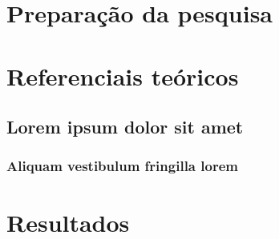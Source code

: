 \documentclass[
	12pt,                     %
	openright,                %
	oneside,                  %
	a4paper,                  %
	english,                  %
	brazil                    %
]{abntex2}
\begin{document}
\frenchspacing  %

\pretextual
\imprimircapa
\imprimirfolhaderosto*


\tableofcontents*
\cleardoublepage

\textual



\part{Preparação da pesquisa}



\part{Referenciais teóricos}

\chapter{Lorem ipsum dolor sit amet}

\section{Aliquam vestibulum fringilla lorem}

\lipsum[1]

\lipsum[2-3]

\part{Resultados}
\end{document}
